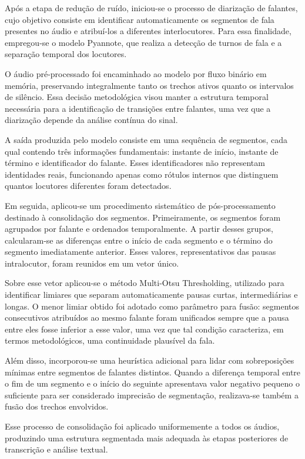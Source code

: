 Após a etapa de redução de ruído, iniciou-se o processo de diarização de falantes, cujo objetivo consiste em identificar automaticamente os segmentos de fala presentes no áudio e atribuí-los a diferentes interlocutores. Para essa finalidade, empregou-se o modelo Pyannote, que realiza a detecção de turnos de fala e a separação temporal dos locutores.

O áudio pré-processado foi encaminhado ao modelo por fluxo binário em memória, preservando integralmente tanto os trechos ativos quanto os intervalos de silêncio. Essa decisão metodológica visou manter a estrutura temporal necessária para a identificação de transições entre falantes, uma vez que a diarização depende da análise contínua do sinal.

A saída produzida pelo modelo consiste em uma sequência de segmentos, cada qual contendo três informações fundamentais: instante de início, instante de término e identificador do falante. Esses identificadores não representam identidades reais, funcionando apenas como rótulos internos que distinguem quantos locutores diferentes foram detectados.

Em seguida, aplicou-se um procedimento sistemático de pós-processamento destinado à consolidação dos segmentos. Primeiramente, os segmentos foram agrupados por falante e ordenados temporalmente. A partir desses grupos, calcularam-se as diferenças entre o início de cada segmento e o término do segmento imediatamente anterior. Esses valores, representativos das pausas intralocutor, foram reunidos em um vetor único.

Sobre esse vetor aplicou-se o método Multi-Otsu Thresholding, utilizado para identificar limiares que separam automaticamente pausas curtas, intermediárias e longas. O menor limiar obtido foi adotado como parâmetro para fusão: segmentos consecutivos atribuídos ao mesmo falante foram unificados sempre que a pausa entre eles fosse inferior a esse valor, uma vez que tal condição caracteriza, em termos metodológicos, uma continuidade plausível da fala.

Além disso, incorporou-se uma heurística adicional para lidar com sobreposições mínimas entre segmentos de falantes distintos. Quando a diferença temporal entre o fim de um segmento e o início do seguinte apresentava valor negativo pequeno o suficiente para ser considerado imprecisão de segmentação, realizava-se também a fusão dos trechos envolvidos.

Esse processo de consolidação foi aplicado uniformemente a todos os áudios, produzindo uma estrutura segmentada mais adequada às etapas posteriores de transcrição e análise textual.

